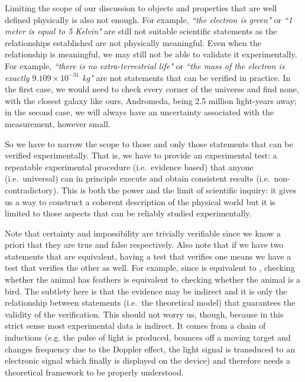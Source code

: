 \documentclass[11pt,letterpaper,fleqn]{memoir} %
\begin{document}
Limiting the scope of our discussion to objects and properties that are well defined physically is also not enough. For example, \emph{``the electron is green"} or \emph{``1 meter is equal to 5 Kelvin"} are still not suitable scientific statements as the relationships established are not physically meaningful. Even when the relationship is meaningful, we may still not be able to validate it experimentally. For example, \emph{``there is no extra-terrestrial life"} or \emph{``the mass of the electron is exactly $9.109 \times 10^{-31}$ kg"} are not statements that can be verified in practice. In the first case, we would need to check every corner of the universe and find none, with the closest galaxy like ours, Andromeda, being 2.5 million light-years away; in the second case, we will always have an uncertainty associated with the measurement, however small.

So we have to narrow the scope to those and only those statements that can be verified experimentally. That is, we have to provide an experimental test: a repeatable experimental procedure (i.e.~evidence based) that anyone (i.e.~universal) can in principle execute and obtain consistent results (i.e.~non-contradictory). This is both the power and the limit of scientific inquiry: it gives us a way to construct a coherent description of the physical world but it is limited to those aspects that can be reliably studied experimentally.

Note that certainty and impossibility are trivially verifiable since we know a priori that they are true and false respectively. Also note that if we have two statements that are equivalent, having a test that verifies one means we have a test that verifies the other as well. For example, since  is equivalent to , checking whether the animal has feathers is equivalent to checking whether the animal is a bird. The subtlety here is that the evidence may be indirect and it is only the relationship between statements (i.e.~the theoretical model) that guarantees the validity of the verification. This should not worry us, though, because in this strict sense most experimental data is indirect. It comes from a chain of inductions (e.g. the pulse of light is produced, bounces off a moving target and changes frequency due to the Doppler effect, the light signal is transduced to an electronic signal which finally is displayed on the device) and therefore needs a theoretical framework to be properly understood.
\end{document}

